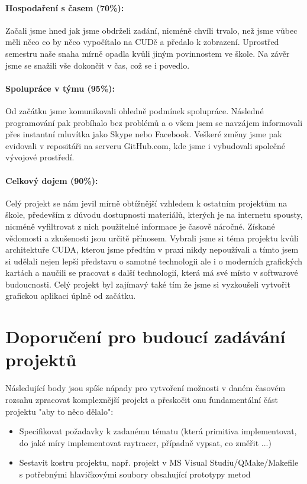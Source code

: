 \documentclass[12pt,a4paper,titlepage,final]{report}
\begin{document}
\paragraph{Hospodaření s časem (70\%):}
Začali jsme hned jak jsme obdrželi zadání, nicméně chvíli trvalo, než jsme vůbec měli něco co by něco vypočítalo na CUDě a předalo k zobrazení. Uprostřed semestru naše snaha mírně opadla kvůli jiným povinnostem ve škole. Na závěr jsme se snažili vše dokončit v čas, což se i povedlo.

\paragraph{Spolupráce v týmu (95\%):}
Od začátku jsme komunikovali ohledně podmínek spolupráce. Následné programování pak probíhalo bez problémů a o všem jsem se navzájem informovali přes instantní mluvítka jako Skype nebo Facebook. Veškeré změny jsme pak evidovali v repositáři na serveru GitHub.com, kde jsme i vybudovali společné vývojové prostředí.

\paragraph{Celkový dojem (90\%):} 
Celý projekt se nám jevil mírně obtížnější vzhledem k ostatním projektům na škole, především z důvodu dostupnosti materiálů, kterých je na internetu spousty, nicméně vyfiltrovat z nich použitelné informace je časově náročné. 
Získané vědomosti a zkušenosti jsou určitě přínosem. 
Vybrali jsme si téma projektu kvůli architektuře CUDA, kterou jsme předtím v praxi nikdy nepoužívali a tímto jsem si udělali nejen lepší představu o samotné technologii ale i o moderních grafických kartách a naučili se pracovat s další technologií, která má své místo v softwarové budoucnosti. Celý projekt byl zajímavý také tím že jsme si vyzkoušeli vytvořit grafickou aplikaci úplně od začátku.


\section{Doporučení pro budoucí zadávání projektů}

Následující body jsou spíše nápady pro vytvoření možnosti v daném časovém rozsahu zpracovat komplexnější projekt a přeskočit onu fundamentální část projektu "aby to něco dělalo":
\begin{itemize}
	\item Specifikovat požadavky k zadanému tématu (která primitiva implementovat, do jaké míry implementovat raytracer, případně vypsat, co změřit ...)
	\item Sestavit kostru projektu, např. projekt v MS Visual Studiu/QMake/Makefile s potřebnými hlavičkovými soubory obsahující prototypy metod
\end{itemize}
\end{document}
